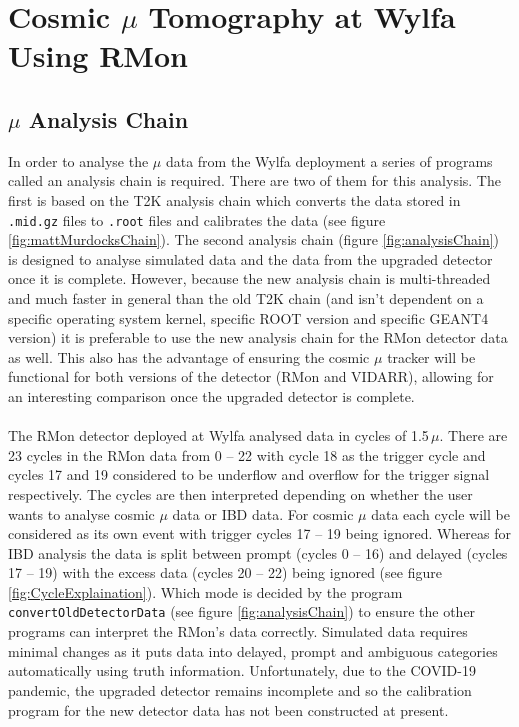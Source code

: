 
\chapter{Cosmic $\mu$ Tomography at Wylfa Using RMon}\label{chp:cosmicMuonTomography}

\ifpdf
    \graphicspath{{Chapter5/Figs/Raster/}{Chapter5/Figs/PDF/}{Chapter5/Figs/}}
\else
    \graphicspath{{Chapter5/Figs/Vector/}{Chapter5/Figs/}}
\fi

\section{$\mu$ Analysis Chain}\label{sec:muonAnalysisChain}
In order to analyse the $\mu$ data from the Wylfa deployment a series of programs called an analysis chain is required. There are two of them for this analysis. The first is based on the T2K analysis chain which converts the data stored in \texttt{.mid.gz} files to \texttt{.root} files and calibrates the data (see figure \ref{fig:mattMurdocksChain}). The second analysis chain (figure \ref{fig:analysisChain}) is designed to analyse simulated data and the data from the upgraded detector once it is complete. However, because the new analysis chain is multi-threaded and much faster in general than the old T2K chain (and isn't dependent on a specific operating system kernel, specific ROOT version and specific GEANT4 version) it is preferable to use the new analysis chain for the RMon detector data as well. This also has the advantage of ensuring the cosmic $\mu$ tracker will be functional for both versions of the detector (RMon and VIDARR), allowing for an interesting comparison once the upgraded detector is complete. 
\\\\The RMon detector deployed at Wylfa analysed data in cycles of 1.5\,$\mu$. There are 23 cycles in the RMon data from 0 -- 22 with cycle 18 as the trigger cycle and cycles 17 and 19 considered to be underflow and overflow for the trigger signal respectively. The cycles are then interpreted depending on whether the user wants to analyse cosmic $\mu$ data or IBD data. For cosmic $\mu$ data each cycle will be considered as its own event with trigger cycles 17 -- 19 being ignored. Whereas for IBD analysis the data is split between prompt (cycles 0 -- 16) and delayed (cycles 17 -- 19) with the excess data (cycles 20 -- 22) being ignored (see figure \ref{fig:CycleExplaination}). Which mode is decided by the program \texttt{convertOldDetectorData} (see figure \ref{fig:analysisChain}) to ensure the other programs can interpret the RMon's data correctly. Simulated data requires minimal changes as it puts data into delayed, prompt and ambiguous categories automatically using truth information. Unfortunately, due to the COVID-19 pandemic, the upgraded detector remains incomplete and so the calibration program for the new detector data has not been constructed at present. 

